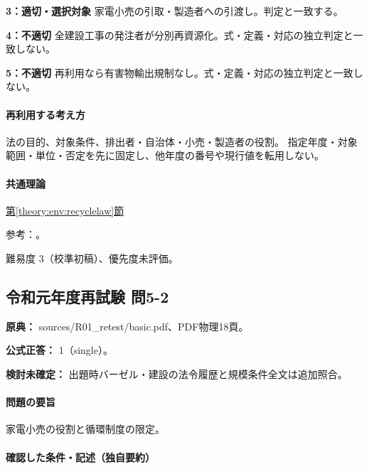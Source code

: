 \noindent\textbf{3：適切・選択対象} 家電小売の引取・製造者への引渡し。判定と一致する。\par

\noindent\textbf{4：不適切} 全建設工事の発注者が分別再資源化。式・定義・対応の独立判定と一致しない。\par

\noindent\textbf{5：不適切} 再利用なら有害物輸出規制なし。式・定義・対応の独立判定と一致しない。\par

\paragraph{再利用する考え方} 法の目的、対象条件、排出者・自治体・小売・製造者の役割。 指定年度・対象範囲・単位・否定を先に固定し、他年度の番号や現行値を転用しない。

\paragraph{共通理論} \hyperref[theory:env:recyclelaw]{第\ref*{theory:env:recyclelaw}節}

\par 参考：\cite{env_circular_law,env_appliance}。

\par 難易度 3（校準初稿）、優先度未評価。

\subsection{令和元年度再試験 問5-2}
\label{q:r01-ret-basic-5-2}

\noindent\textbf{原典：} sources/R01\_retest/basic.pdf、PDF物理18頁。

\textbf{公式正答：} 1（single）。

\par\textbf{検討未確定：} 出題時バーゼル・建設の法令履歴と規模条件全文は追加照合。

\paragraph{問題の要旨} 家電小売の役割と循環制度の限定。

\paragraph{確認した条件・記述（独自要約）}\mbox{}\par

